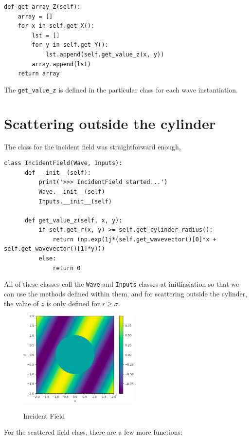 \begin{lstlisting}
def get_array_Z(self):
    array = []
    for x in self.get_X():
        lst = []
        for y in self.get_Y():
            lst.append(self.get_value_z(x, y))
        array.append(lst)
    return array
\end{lstlisting}

The \verb!get_value_z! is defined in the particular class for each wave instantiation.

\section{Scattering outside the cylinder}

The class for the incident field was straightforward enough,

\begin{lstlisting}
class IncidentField(Wave, Inputs):
      def __init__(self):
          print('>>> IncidentField started...')
          Wave.__init__(self)
          Inputs.__init__(self)

      def get_value_z(self, x, y):
          if self.get_r(x, y) >= self.get_cylinder_radius():
              return (np.exp(1j*(self.get_wavevector()[0]*x + self.get_wavevector()[1]*y)))
          else:
              return 0
\end{lstlisting}

All of these classes call the \verb!Wave! and \verb!Inputs! classes at initliasiation so that we can use the methods defined within them, and for scattering outside the cylinder, the value of $z$ is only defined for $r \geq \sigma$.

\begin{figure}
  \centering
  \caption{Incident Field}
  \includegraphics[width=6cm]{../figures/incident_field}\label{fig:incident_field}
\end{figure}

For the scattered field class, there are a few more functions:

